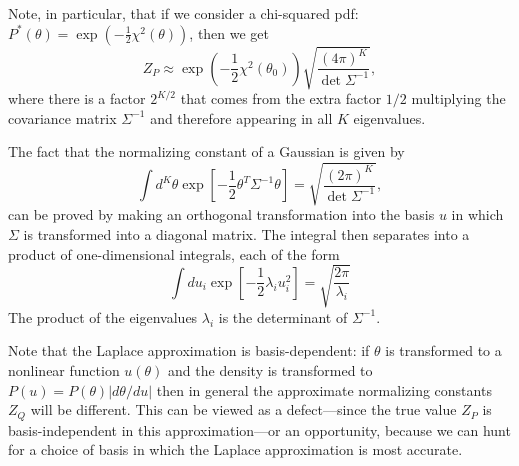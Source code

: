 \documentclass[%
oneside,                 %
final,                   %
10pt]{article}
\begin{document}
Note, in particular, that if we consider a chi-squared pdf: $P^*(\theta) = \exp \left( -\frac{1}{2} \chi^2(\theta)\right)$, then we get
$$
Z_P \approx \exp \left( -\frac{1}{2} \chi^2(\theta_0)\right) \sqrt{\frac{(4\pi)^K}{\det\Sigma^{-1}}},
$$
where there is a factor $2^{K/2}$ that comes from the extra factor $1/2$ multiplying the covariance matrix $\Sigma^{-1}$ and therefore appearing in all $K$ eigenvalues.

The fact that the normalizing constant of a Gaussian is given by 
$$
\int d^K\theta \exp \left[ - \frac{1}{2}\theta^T \Sigma^{-1} \theta \right] = \sqrt{\frac{(2\pi)^K}{\det\Sigma^{-1}}},
$$
can be proved by making an orthogonal transformation into the basis $u$ in which $\Sigma$ is transformed into a diagonal matrix. The integral then separates into a product of one-dimensional integrals, each of the form
$$
\int du_i \exp \left[ -\frac{1}{2} \lambda_i u_i^2 \right] = \sqrt{\frac{2\pi}{\lambda_i}}
$$
The product of the eigenvalues $\lambda_i$ is the determinant of $\Sigma^{-1}$.

Note that the Laplace approximation is basis-dependent: if $\theta$ is transformed to a nonlinear function $u(\theta)$ and the density is transformed to $P(u) = P(\theta) |d\theta/du|$ then in general the approximate normalizing constants $Z_Q$ will be different. This can be viewed as a defect---since the true value $Z_P$ is basis-independent in this approximation---or an opportunity, because we can hunt for a choice of basis in which the Laplace approximation is most accurate.



\end{document}
